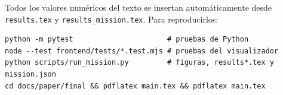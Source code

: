 \documentclass[11pt,a4paper]{article}
\begin{document}
\medskip\noindent
Todos los valores numéricos del texto se insertan automáticamente desde \texttt{results.tex} y \texttt{results\_mission.tex}. Para reproducirlos:
\begin{verbatim}
python -m pytest                      # pruebas de Python
node --test frontend/tests/*.test.mjs # pruebas del visualizador
python scripts/run_mission.py         # figuras, results*.tex y mission.json
cd docs/paper/final && pdflatex main.tex && pdflatex main.tex
\end{verbatim}
\end{document}
